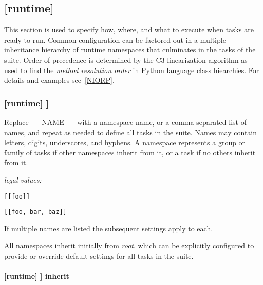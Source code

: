 \subsection{[runtime]}

This section is used to specify how, where, and what to execute when
tasks are ready to run. Common
configuration can be factored out in a multiple-inheritance hierarchy of
runtime namespaces that culminates in the tasks of the suite. Order of
precedence is determined by the C3 linearization algorithm as used to
find the {\em method resolution order} in Python language class
hiearchies. For details and examples see~\ref{NIORP}.

\subsubsection[{[[}\_\_NAME\_\_{]]}]{[runtime] \textrightarrow [[\_\_NAME\_\_]]}

Replace \_\_NAME\_\_ with a namespace name, or a comma-separated list of
names, and repeat as needed to define all tasks in the suite. Names may
contain letters, digits, underscores, and hyphens. A namespace
represents a group or family of tasks if other namespaces inherit from
it, or a task if no others inherit from it.


\begin{myitemize}
\item {\em legal values:}
    \begin{myitemize}
        \item \lstinline=[[foo]]=
        \item \lstinline=[[foo, bar, baz]]=
    \end{myitemize}
\end{myitemize}

If multiple names are listed the subsequent settings apply to each.

All namespaces inherit initially from {\em root}, which can be
explicitly configured to provide or override default settings
for all tasks in the suite.

\paragraph[inherit]{[runtime] \textrightarrow [[\_\_NAME\_\_]] \textrightarrow inherit}

